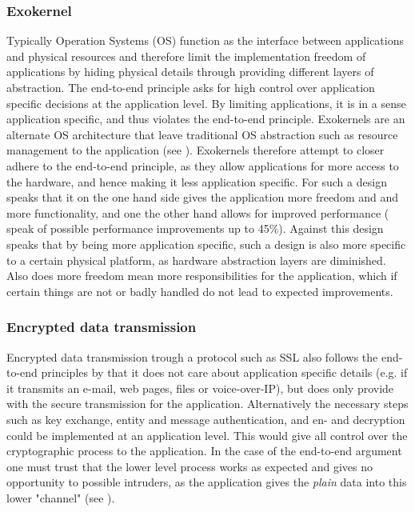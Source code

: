 \documentclass[12pt,a4paper,fleqn]{article}
\begin{document}
\subsubsection*{Exokernel}

Typically Operation Systems (OS) function as the interface between applications and physical resources and therefore limit the implementation freedom of applications by hiding physical details through providing different layers of abstraction. The end-to-end principle asks for high control over application specific decisions at the application level. By limiting applications, it is in a sense application specific, and thus violates the end-to-end principle. Exokernels are an alternate OS architecture that leave traditional OS abstraction such as resource management to the application (see \cite{Engler1995}). Exokernels therefore attempt to closer adhere to the end-to-end principle, as they allow applications for more access to the hardware, and hence making it less application specific. For such a design speaks that it on the one hand side gives the application more freedom and and more functionality, and one the other hand allows for improved performance (\cite{Engler1995} speak of possible performance improvements up to 45\%). Against this design speaks that by being more application specific, such a design is also more specific to a certain physical platform, as hardware abstraction layers are diminished. Also does more freedom mean more responsibilities for the application, which if certain things are not or badly handled do not lead to expected improvements.

\subsubsection*{Encrypted data transmission}

Encrypted data transmission trough a protocol such as SSL also follows the end-to-end principles by that it does not care about application specific details (e.g. if it transmits an e-mail, web pages, files or voice-over-IP), but does only provide with the secure transmission for the application. Alternatively the necessary steps such as key exchange, entity and message authentication, and en- and decryption could be implemented at an application level. This would give all control over the cryptographic process to the application. In the case of the end-to-end argument one must trust that the lower level process works as expected and gives no opportunity to possible intruders, as the application gives the \emph{plain} data into this lower "channel" (see \cite{Saltzer1984}).
\end{document}
